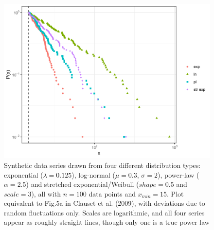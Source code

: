 \documentclass[
  12pt,
]{book}
\begin{document}
\begin{figure}

{\centering \includegraphics[width=0.9\linewidth]{bookdown-demo_files/figure-latex/05-distfit-1} 

}

\caption{Synthetic data series drawn from four different distribution types: exponential (\(\lambda=0.125\)), log-normal (\(\mu=0.3\), \(\sigma=2\)), power-law (\(\alpha=2.5\)) and stretched exponential/Weibull (\(shape = 0.5\) and \(scale = 3\)), all with \(n=100\) data points and \(x_{min}=15\). Plot equivalent to Fig.5a in Clauset et al. (2009), with deviations due to random fluctuations only. Scales are logarithmic, and all four series appear as roughly straight lines, though only one is a true power law}\label{fig:05-distfit}
\end{figure}
\end{document}

